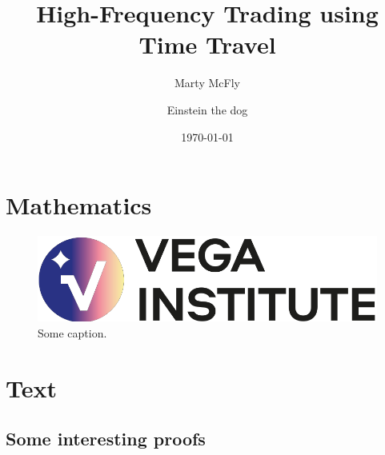 \documentclass[
]{vegaarticle}
\title{High-Frequency Trading using Time Travel}
\author[1]{Marty McFly}
\affil[1]{University of Time Travel}
\author[2]{Einstein the dog}
\affil[2]{University of Time Travel}
\date{\today}
\begin{document}
    \maketitle	
    \begin{abstract}
        \blindtext
        \blindtext
    \end{abstract}  
    
    \introduction 
    
    \blindtext

    \blindrandomtrue

    \blindmathtrue

    \section{Mathematics}
    \blindmathpaper
    \begin{figure}[htp]
		\centering
		\includegraphics[width=.4\textwidth]{vega_logo_smaller.png}
		\caption{Some caption.}
	\end{figure}

    \section{Text}
    \Blinddescription

    \blindmathfalse
    \conclusion
    \Blindenumerate

    
	\begin{appendices}
	
	\section{Some interesting proofs}
		
	\blindmathtrue
	
	\blindtext
	\blindtext
	
	\end{appendices}    
\end{document}
